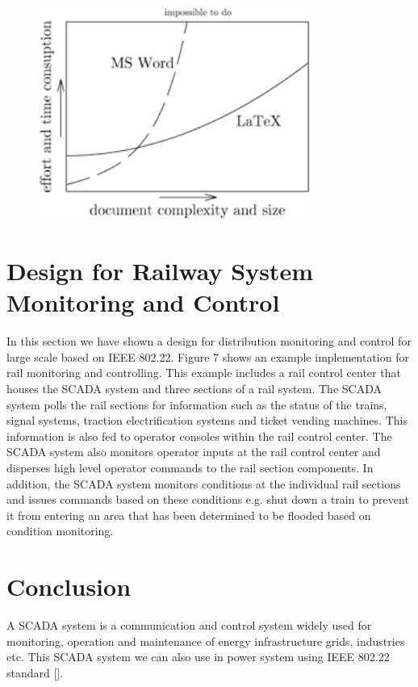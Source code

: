 \documentclass[conference]{IEEEtran}
\begin{document}
\begin{Summary - }
\vspace{1cm}

\begin{figure}[h!] %
  \centering
  \includegraphics[width=3.5in]{im5.png}\\
\end{figure}

\vspace{1cm}

\section{Design for Railway System Monitoring and Control}
In this section we have shown a design for distribution
monitoring and control for large scale based on IEEE 802.22.
Figure 7 shows an example implementation for rail monitoring
and controlling. This example includes a rail control center that
houses the SCADA system and three sections of a rail system.
The SCADA system polls the rail sections for information such
as the status of the trains, signal systems, traction electrification
systems and ticket vending machines. This information is also
fed to operator consoles within the rail control center. The
SCADA system also monitors operator inputs at the rail control
center and disperses high level operator commands to the rail
section components. In addition, the SCADA system monitors
conditions at the individual rail sections and issues commands
based on these conditions e.g. shut down a train to prevent it
from entering an area that has been determined to be flooded
based on condition monitoring. 

\section{Conclusion}
A SCADA system is a communication and control system
widely used for monitoring, operation and maintenance of
energy infrastructure grids, industries etc. This SCADA system
we can also use in power system using IEEE 802.22 standard
[]. 



\end{Summary - }
\end{document}
